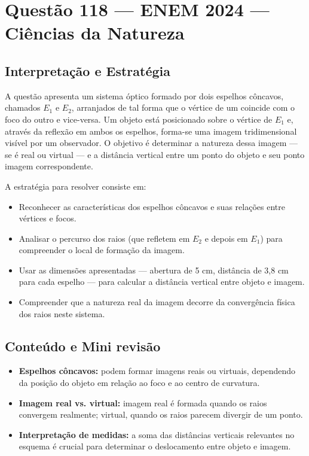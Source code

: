 \documentclass{article}
\begin{document}
\section*{Questão 118 — ENEM 2024 — Ciências da Natureza}

\subsection*{Interpretação e Estratégia}

A questão apresenta um sistema óptico formado por dois espelhos côncavos, chamados $E_1$ e $E_2$, arranjados de tal forma que o vértice de um coincide com o foco do outro e vice-versa. Um objeto está posicionado sobre o vértice de $E_1$ e, através da reflexão em ambos os espelhos, forma-se uma imagem tridimensional visível por um observador. O objetivo é determinar a natureza dessa imagem — se é real ou virtual — e a distância vertical entre um ponto do objeto e seu ponto imagem correspondente.

A estratégia para resolver consiste em:
\begin{itemize}
  \item Reconhecer as características dos espelhos côncavos e suas relações entre vértices e focos.
  \item Analisar o percurso dos raios (que refletem em $E_2$ e depois em $E_1$) para compreender o local de formação da imagem.
  \item Usar as dimensões apresentadas — abertura de 5 cm, distância de 3,8 cm para cada espelho — para calcular a distância vertical entre objeto e imagem.
  \item Compreender que a natureza real da imagem decorre da convergência física dos raios neste sistema.
\end{itemize}

\subsection*{Conteúdo e Mini revisão}

\begin{itemize}
  \item \textbf{Espelhos côncavos:} podem formar imagens reais ou virtuais, dependendo da posição do objeto em relação ao foco e ao centro de curvatura.
  \item \textbf{Imagem real vs. virtual:} imagem real é formada quando os raios convergem realmente; virtual, quando os raios parecem divergir de um ponto.
  \item \textbf{Interpretação de medidas:} a soma das distâncias verticais relevantes no esquema é crucial para determinar o deslocamento entre objeto e imagem.
\end{itemize}
\end{document}
